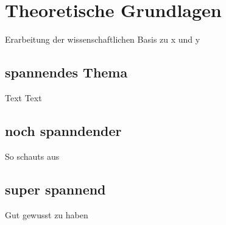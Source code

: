 \chapter{Theoretische Grundlagen}
\label{chapter:kapitel2}

Erarbeitung der wissenschaftlichen Basis zu x und y

\section{spannendes Thema}
\label{section:x}

Text Text

\section{noch spanndender}
\label{y}

So schauts aus

\section{super spannend}
\label{section:z}

Gut gewusst zu haben
